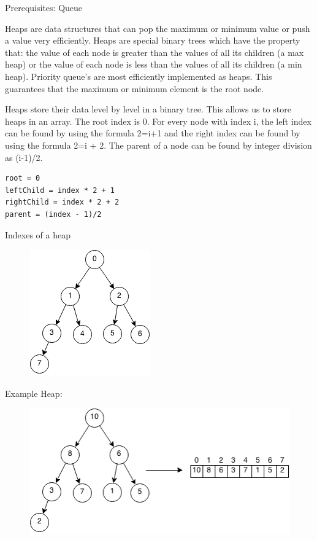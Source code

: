 \documentclass[11pt,oneside]{book}
\makeatletter
\def\maxwidth#1{\ifdim\Gin@nat@width>#1 #1\else\Gin@nat@width\fi}
\makeatother
\begin{document}
Prerequisites: Queue



Heaps are data structures that can pop the maximum or minimum value or push a value very efficiently. Heaps are special binary trees which have the property that: the value of each node is greater than the values of all its children (a max heap) or the value of each node is less than the values of all its children (a min heap). Priority queue's are most efficiently implemented as heaps. This guarantees that the maximum or minimum element is the root node.

Heaps store their data level by level in a binary tree. This allows us to store heaps in an array. The root index is 0. For every node with index i, the left index can be found by using the formula 2=i+1 and the right index can be found by using the formula 2=i + 2. The parent of a node can be found by integer division as (i-1)/2.

\begin{lstlisting}
root = 0
leftChild = index * 2 + 1
rightChild = index * 2 + 2
parent = (index - 1)/2
\end{lstlisting}

Indexes of a heap

\vspace{5px}\begin{figure}[H]\centering
        \includegraphics[width=0.66\maxwidth{\textwidth}]{maxheap2.png}
        \end{figure}

Example Heap:

\vspace{5px}\begin{figure}[H]\centering
        \includegraphics[width=0.66\maxwidth{\textwidth}]{maxheap.png}
        \end{figure}
\end{document}
